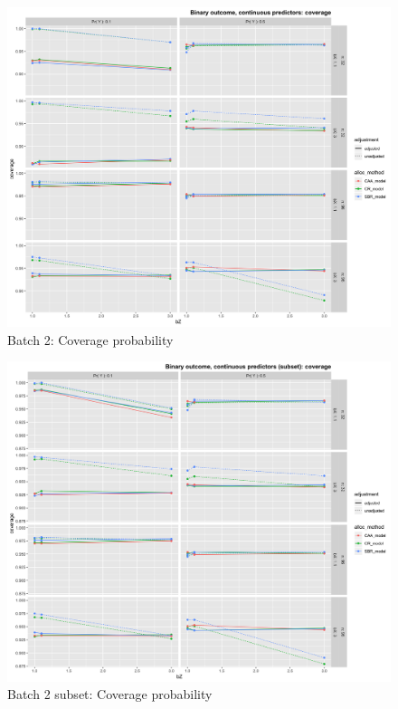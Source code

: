 \begin{figure}[H]
	\includegraphics[width=\linewidth]{figures/b2_coverage_all_methods_adj_unadj}
	\caption{Batch 2: Coverage probability}
	\label{fig:b2c}
\end{figure}

\begin{figure}[H]
	\includegraphics[width=\linewidth]{figures/b2_sub_coverage_all_methods_adj_unadj}
	\caption{Batch 2 subset: Coverage probability}
	\label{fig:b2sc}
\end{figure}

